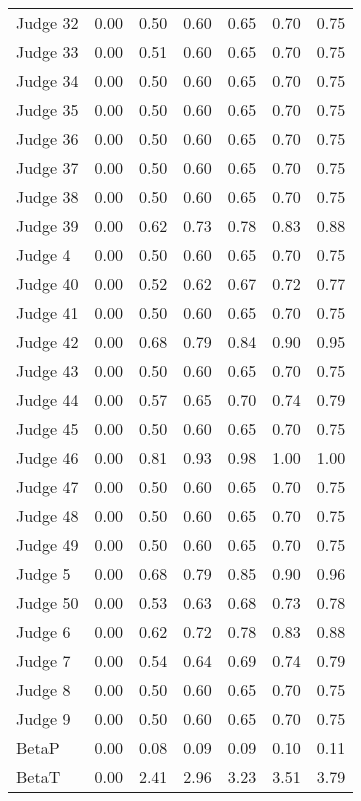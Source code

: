 \begin{tabular}{lrrrrrr}
 Judge 32 & 0.00 & 0.50 & 0.60 &  0.65 & 0.70 &  0.75 \\
 Judge 33 & 0.00 & 0.51 & 0.60 &  0.65 & 0.70 &  0.75 \\
 Judge 34 & 0.00 & 0.50 & 0.60 &  0.65 & 0.70 &  0.75 \\
 Judge 35 & 0.00 & 0.50 & 0.60 &  0.65 & 0.70 &  0.75 \\
 Judge 36 & 0.00 & 0.50 & 0.60 &  0.65 & 0.70 &  0.75 \\
 Judge 37 & 0.00 & 0.50 & 0.60 &  0.65 & 0.70 &  0.75 \\
 Judge 38 & 0.00 & 0.50 & 0.60 &  0.65 & 0.70 &  0.75 \\
 Judge 39 & 0.00 & 0.62 & 0.73 &  0.78 & 0.83 &  0.88 \\
  Judge 4 & 0.00 & 0.50 & 0.60 &  0.65 & 0.70 &  0.75 \\
 Judge 40 & 0.00 & 0.52 & 0.62 &  0.67 & 0.72 &  0.77 \\
 Judge 41 & 0.00 & 0.50 & 0.60 &  0.65 & 0.70 &  0.75 \\
 Judge 42 & 0.00 & 0.68 & 0.79 &  0.84 & 0.90 &  0.95 \\
 Judge 43 & 0.00 & 0.50 & 0.60 &  0.65 & 0.70 &  0.75 \\
 Judge 44 & 0.00 & 0.57 & 0.65 &  0.70 & 0.74 &  0.79 \\
 Judge 45 & 0.00 & 0.50 & 0.60 &  0.65 & 0.70 &  0.75 \\
 Judge 46 & 0.00 & 0.81 & 0.93 &  0.98 & 1.00 &  1.00 \\
 Judge 47 & 0.00 & 0.50 & 0.60 &  0.65 & 0.70 &  0.75 \\
 Judge 48 & 0.00 & 0.50 & 0.60 &  0.65 & 0.70 &  0.75 \\
 Judge 49 & 0.00 & 0.50 & 0.60 &  0.65 & 0.70 &  0.75 \\
  Judge 5 & 0.00 & 0.68 & 0.79 &  0.85 & 0.90 &  0.96 \\
 Judge 50 & 0.00 & 0.53 & 0.63 &  0.68 & 0.73 &  0.78 \\
  Judge 6 & 0.00 & 0.62 & 0.72 &  0.78 & 0.83 &  0.88 \\
  Judge 7 & 0.00 & 0.54 & 0.64 &  0.69 & 0.74 &  0.79 \\
  Judge 8 & 0.00 & 0.50 & 0.60 &  0.65 & 0.70 &  0.75 \\
  Judge 9 & 0.00 & 0.50 & 0.60 &  0.65 & 0.70 &  0.75 \\
    BetaP & 0.00 & 0.08 & 0.09 &  0.09 & 0.10 &  0.11 \\
    BetaT & 0.00 & 2.41 & 2.96 &  3.23 & 3.51 &  3.79 \\
\bottomrule
\end{tabular}
